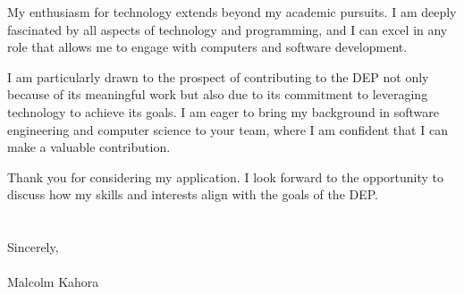 \documentclass[letterpaper,11pt]{article}
\begin{document}

My enthusiasm for technology extends beyond my academic pursuits. I am deeply fascinated by all aspects of technology and programming, and I can excel in any role that allows me to engage with computers and software development.


I am particularly drawn to the prospect of contributing to the DEP not only because of its meaningful work but also due to its commitment to leveraging technology to achieve its goals. I am eager to bring my background in software engineering and computer science to your team, where I am confident that I can make a valuable contribution.


Thank you for considering my application. I look forward to the opportunity to discuss how my skills and interests align with the goals of the DEP. \\
\\
\\
Sincerely,\\
\\
Malcolm Kahora
\end{document}
